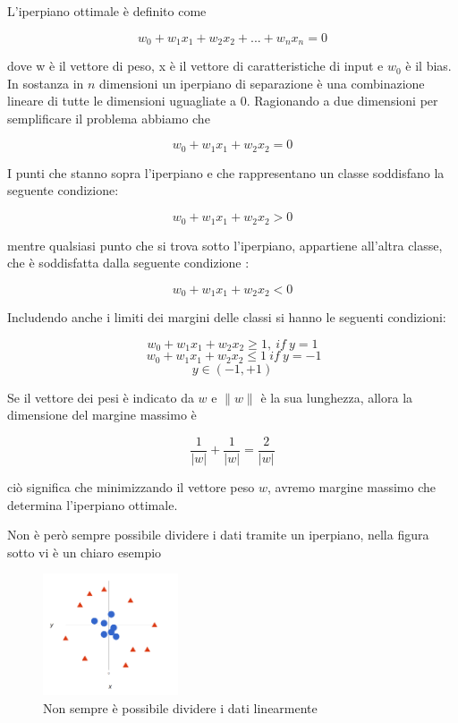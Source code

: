 \documentclass[12pt,italian]{report}
\begin{document}
L'iperpiano ottimale è definito come 
\begin{center}
	\[w_0 + w_1x_1 + w_2x_2 +...+ w_nx_n= 0\]
\end{center}
dove w è il vettore di peso, x è il vettore di caratteristiche di input e $w_0$ è il bias.
In sostanza in $n$ dimensioni un iperpiano di separazione è una combinazione lineare di tutte le dimensioni uguagliate a 0.
Ragionando a due dimensioni per semplificare il problema abbiamo che 
\begin{center}
	\[w_0 + w_1x_1 + w_2x_2 = 0\]
\end{center}
I punti che stanno sopra l'iperpiano e che rappresentano un classe soddisfano la seguente condizione:
\begin{center}
	\[w_0 + w_1x_1+w_2x_2 > 0\]
\end{center}
mentre qualsiasi punto che si trova sotto l'iperpiano, appartiene all'altra classe, che è soddisfatta dalla seguente condizione :
\begin{center}
	\[w_0 + w_1x_1+w_2x_2 < 0\]
\end{center}
Includendo anche i limiti dei margini delle classi si hanno le seguenti condizioni:
\begin{center}
	\[w_0 + w_1x_1+w_2x_2 \geq 1,
	\ if
	\ y=1\]
	\[
	\ w_0 + w_1x_1+w_2x_2 \leq 1 
	\ if
	\ y = -1
	\]
	\[ y \in (-1, +1)\]
\end{center}
Se il vettore dei pesi è indicato da $w$ e $\parallel w \parallel$ è la sua lunghezza, allora la dimensione del margine massimo è 
\begin{center}
	\[ \frac{1}{\left | w \right |} + \frac{1}{\left | w \right |} = \frac{2}{\left | w \right |}\]
\end{center}
ciò significa che minimizzando il vettore peso $w$, avremo margine massimo che determina l'iperpiano ottimale.

Non è però sempre possibile dividere i dati tramite un iperpiano, nella figura sotto vi è un chiaro esempio

\begin{figure}[h]
	\centering
	\includegraphics[width = 40mm]{immagini/esempio_dataset_non_lineare}
	\caption{Non sempre è possibile dividere i dati linearmente}
\end{figure}
\end{document}
